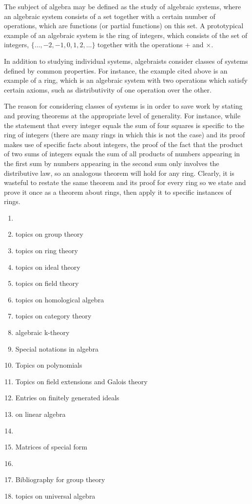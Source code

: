 \documentclass[12pt]{article}
\begin{document}
The subject of algebra may be defined as the study of algebraic
systems, where an algebraic system consists of a set together
with a certain number of operations, which are functions (or
partial functions) on this set.  A prototypical example of an 
algebraic system is the ring of integers, which consists of the
set of integers, $\{ \ldots, -2, -1, 0, 1, 2, \ldots \}$ together
with the operations $+$ and $\times$.  

In addition to studying individual systems, algebraists consider
classes of systems defined by common properties.  For instance,
the example cited above is an example of a ring, which is an algebraic 
system with two operations which satisfy certain axioms, such as
distributivity of one operation over the other.

The reason for considering classes of systems 
is in order to save work by stating and proving theorems at the 
appropriate level of generality.  For instance, while the statement
that every integer equals the sum of four squares is specific to the
ring of integers (there are many rings in which this is not the case)
and its proof makes use of specific facts about integers, the proof
of the fact that the product of two sums of integers equals the sum
of all products of numbers appearing in the first sum by numbers
appearing in the second sum only involves the distributive law, so
an analogous theorem will hold for any ring.  Clearly, it is 
wasteful to restate the same theorem and its proof for every ring
so we state and prove it once as a theorem about rings, then apply
it to specific instances of rings.  

\begin{enumerate}
\item {}
\item topics on group theory
\item topics on ring theory
\item topics on ideal theory
\item topics on field theory
\item topics on homological algebra
\item topics on category theory
\item algebraic k-theory
\item Special notations in algebra
\item Topics on polynomials
\item Topics on field extensions and Galois theory
\item Entries on finitely generated ideals
\item {} on linear algebra
\item {}
\item Matrices of special form
\item {}
\item Bibliography for group theory
\item topics on universal algebra
\end{enumerate}

\end{document}

